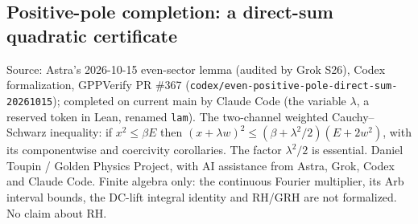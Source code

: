 \documentclass{report}
\theoremstyle{definition}
\begin{document}
\begin{itemize}
\begin{itemize}
\section{Positive-pole completion: a direct-sum quadratic certificate}
Source: Astra's 2026-10-15 even-sector lemma (audited by Grok S26), Codex formalization, GPPVerify PR \#367 (\texttt{codex/even-positive-pole-direct-sum-20261015}); completed on current main by Claude Code (the variable $\lambda$, a reserved token in Lean, renamed \texttt{lam}). The two-channel weighted Cauchy--Schwarz inequality: if $x^2\le\beta E$ then $(x+\lambda w)^2\le(\beta+\lambda^2/2)(E+2w^2)$, with its componentwise and coercivity corollaries. The factor $\lambda^2/2$ is essential.
Daniel Toupin / Golden Physics Project, with AI assistance from Astra, Grok, Codex and Claude Code. Finite algebra only: the continuous Fourier multiplier, its Arb interval bounds, the DC-lift integral identity and RH/GRH are not formalized. No claim about RH.

\end{itemize}
\end{itemize}
\end{document}
